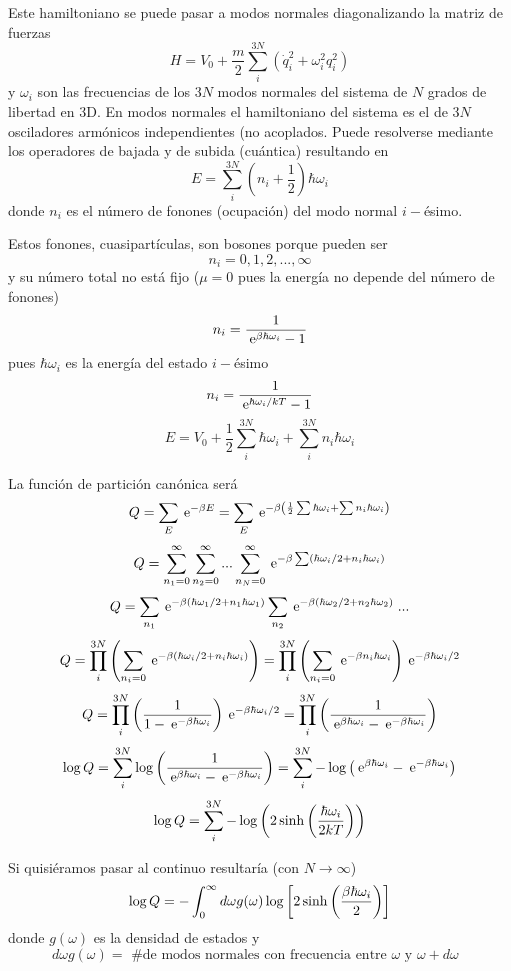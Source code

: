 \documentclass[10pt,oneside]{CBFT_book}
\begin{document}
Este hamiltoniano se puede pasar a modos normales diagonalizando la matriz de fuerzas
\[
	H = V_0 + \frac{m}{2}  \sum_i^{3N} \left( \dot{q}_i^2 + \omega_i^2 q_i^2 \right)
\]
y $\omega_i$ son las frecuencias de los $3N$ modos normales del sistema de $N$ grados de libertad en
3D. En modos normales el hamiltoniano del sistema es el de $3N$ osciladores armónicos independientes
(no acoplados. 
Puede resolverse mediante los operadores de bajada y de subida (cuántica) resultando en
\[
	E = \sum_i^{3N} \left( n_i + \frac{1}{2} \right) \hbar \omega_i
\]
donde $n_i$ es el número de fonones (ocupación) del modo normal $i-$ésimo.

Estos fonones, cuasipartículas, son bosones porque pueden ser 
\[
	n_i = 0,1,2,...,\infty
\]
y su número total no está fijo ($\mu=0$ pues la energía no depende del número de fonones)
\[
	n_i = \frac{1}{\:\mathrm{e}^{\beta\hbar \omega_i} -1 }
\]
pues $\hbar\omega_i$ es la energía del estado $i-$ésimo
\[
	n_i = \frac{1}{\:\mathrm{e}^{ \hbar \omega_i / kT } -1 }
\]
\[
	E = V_0 + \frac{1}{2} \sum_i^{3N} \hbar \omega_i + \sum_i^{3N} n_i \hbar \omega_i
\]

La función de partición canónica será 
\[
	Q = \sum_E \:\mathrm{e}^{ -\beta E } =
	\sum_E \:\mathrm{e}^{ -\beta \left( \frac{1}{2} \sum \hbar \omega_i + \sum n_i \hbar \omega_i \right) }
\]
\[
	Q = \sum_{n_1=0}^\infty \sum_{n_2=0}^\infty ... \sum_{n_N=0}^\infty 
	\:\mathrm{e}^{ -\beta \sum \left( \hbar \omega_i /2  + n_i \hbar \omega_i \right) }
\]
\[
	Q = \sum_{n_1} \:\mathrm{e}^{ -\beta \left( \hbar \omega_1 /2 + n_1 \hbar\omega_1 \right) }
	\sum_{n_2} \:\mathrm{e}^{ -\beta \left( \hbar \omega_2 /2 + n_2 \hbar\omega_2 \right) } \; ...
\]
\[
	Q = \prod_i^{3N} \left(
	\sum_{n_i=0} \:\mathrm{e}^{ -\beta \left( \hbar \omega_i /2 + n_i \hbar\omega_i \right) } 
	\right) = \prod_i^{3N} \left(
	\sum_{n_i=0} \:\mathrm{e}^{ -\beta n_i \hbar\omega_i } \right) \:\mathrm{e}^{ -\beta \hbar \omega_i /2 }
\]
\[
	Q = \prod_i^{3N} \left(
	\frac{1}{1-\:\mathrm{e}^{ -\beta \hbar \omega_i } } \right)  \:\mathrm{e}^{ -\beta \hbar \omega_i /2 } = 
	\prod_i^{3N} \left( \frac{1}{ \:\mathrm{e}^{ \beta \hbar \omega_i } -\:\mathrm{e}^{ -\beta \hbar \omega_i } } \right)
\]
\[
	\log Q = \sum_i^{3N} \log \left( \frac{1}{ \:\mathrm{e}^{ \beta \hbar \omega_i } -\:\mathrm{e}^{ -\beta \hbar \omega_i } } 
	\right) = 
	\sum_i^{3N} - \log \left( { \:\mathrm{e}^{ \beta \hbar \omega_i } -\:\mathrm{e}^{ -\beta \hbar \omega_i } } \right)
\]
\[
	\log Q = \sum_i^{3N} - \log \left( 2 \sinh \left( \frac{ \hbar\omega_i }{ 2kT } \right) \right)
\]

Si quisiéramos pasar al continuo resultaría (con $N \to \infty$)
\[
	\log Q = - \int_0^\infty d\omega g(\omega) \log \left[ 2 \sinh \left( \frac{ \beta\hbar\omega_i }{ 2 } \right) \right]
\]
donde $ g(\omega) $ es la densidad de estados y 
\[
	d\omega g(\omega) = \text{ \# de modos normales con frecuencia entre $\omega$ y $\omega + d\omega$ }
\]
\end{document}
